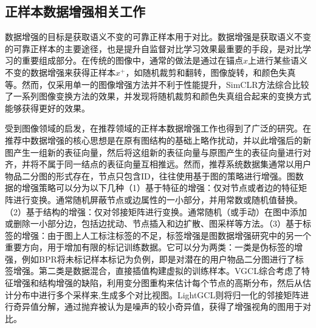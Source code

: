 \subsection{正样本数据增强相关工作}
数据增强的目标是获取语义不变的可靠正样本用于对比。数据增强是获取语义不变的可靠正样本的主要途径，也是提升自监督对比学习效果最重要的手段，是对比学习的重要组成部分。在传统的图像中，通常的做法是通过在锚点$x$上进行某些语义不变的数据增强来获得正样本$x^+$，如随机裁剪和翻转\cite{Oord:2018:arxiv}，图像旋转\cite{Komodakis:2018:ICLR}，和颜色失真\cite{Szegedy:2015:CVPR}等。然而，仅采用单一的图像增强方法并不利于性能提升，SimCLR\cite{Chen:2020:ICML}方法综合比较了一系列图像变换方法的效果，并发现将随机裁剪和颜色失真组合起来的变换方式能够获得更好的效果。

受到图像领域的启发，在推荐领域的正样本数据增强工作也得到了广泛的研究。在推荐中数据增强的核心思想是在原有图结构的基础上略作扰动，并以此增强后的新图产生一组新的表征向量，然后将这组新的表征向量与原图产生的表征向量进行对齐，并将不属于同一结点的表征向量互相推远。然而，推荐系统数据集通常以用户物品二分图的形式存在，节点只包含ID，往往使用基于图的策略进行增强。图数据的增强策略可以分为以下几种（1）基于特征的增强\cite{liu2022local,velivckovic2018deep,zhu2020deep,you2020graph,pmlr-v139-you21a}：仅对节点或者边的特征矩阵进行变换。通常随机屏蔽节点或边属性的一小部分，并用常数或随机值替换。（2）基于结构的增强\cite{pmlr-v119-zheng20d,10.1145/3437963.3441734,10.1145/3437963.3441720,page1998pagerank}：仅对邻接矩阵进行变换。通常随机（或手动）在图中添加或删除一小部分边，包括边扰动\cite{pmlr-v119-zheng20d,10.1145/3437963.3441734}、节点插入\cite{10.1145/3437963.3441720}和边扩散\cite{page1998pagerank}、图采样\cite{pmlr-v119-zheng20d}等方法。（3）基于标签的增强\cite{Steffen:2014:WSDM,zhang2020graph,verma2019manifold}：由于图上人工标注标签的不足，标签增强是图数据增强研究中的另一个重要方向，用于增加有限的标记训练数据。它可以分为两类：一类是伪标签的增强，例如BPR\cite{Steffen:2014:WSDM}将未标记样本标记为负例，即是对潜在的用户物品二分图进行了标签增强。第二类是数据混合\cite{zhang2020graph,verma2019manifold}，直接插值构建虚拟的训练样本。VGCL\cite{yang2023generative}综合考虑了特征增强和结构增强的缺陷，利用变分图重构来估计每个节点的高斯分布，然后从估计分布中进行多个采样来,生成多个对比视图。LightGCL\cite{lightgcl:2023:ICLR}则将归一化的邻接矩阵进行奇异值分解，通过抛弃被认为是噪声的较小奇异值，获得了增强视角的图用于对比。

